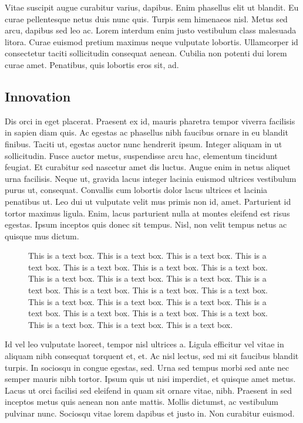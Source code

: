 \documentclass[
  11pt,
  letterpaper,
  DIV=11,
  numbers=noendperiod]{scrartcl}
\begin{document}
Vitae suscipit augue curabitur varius, dapibus. Enim phasellus elit ut
blandit. Eu curae pellentesque netus duis nunc quis. Turpis sem
himenaeos nisl. Metus sed arcu, dapibus sed leo ac. Lorem interdum enim
justo vestibulum class malesuada litora. Curae euismod pretium maximus
neque vulputate lobortis. Ullamcorper id consectetur taciti sollicitudin
consequat aenean. Cubilia non potenti dui lorem curae amet. Penatibus,
quis lobortis eros sit, ad.

\hypertarget{innovation}{%
\subsection{Innovation}\label{innovation}}

Dis orci in eget placerat. Praesent ex id, mauris pharetra tempor
viverra facilisis in sapien diam quis. Ac egestas ac phasellus nibh
faucibus ornare in eu blandit finibus. Taciti ut, egestas auctor nunc
hendrerit ipsum. Integer aliquam in ut sollicitudin. Fusce auctor metus,
suspendisse arcu hac, elementum tincidunt feugiat. Et curabitur sed
nascetur amet dis luctus. Augue enim in netus aliquet urna facilisis.
Neque ut, gravida lacus integer lacinia euismod ultrices vestibulum
purus ut, consequat. Convallis cum lobortis dolor lacus ultrices et
lacinia penatibus ut. Leo dui ut vulputate velit mus primis non id,
amet. Parturient id tortor maximus ligula. Enim, lacus parturient nulla
at montes eleifend est risus egestas. Ipsum inceptos quis donec sit
tempus. Nisl, non velit tempus netus ac quisque mus dictum.

\begin{figure}
This is a text box. This is a text box. This is a text box. This is a
text box. This is a text box. This is a text box. This is a text box.
This is a text box. This is a text box. This is a text box. This is a
text box. This is a text box. This is a text box. This is a text box.
This is a text box. This is a text box. This is a text box. This is a
text box. This is a text box. This is a text box. This is a text box.
This is a text box. This is a text box. This is a text box.

\end{figure}

Id vel leo vulputate laoreet, tempor nisl ultrices a. Ligula efficitur
vel vitae in aliquam nibh consequat torquent et, et. Ac nisl lectus, sed
mi sit faucibus blandit turpis. In sociosqu in congue egestas, sed. Urna
sed tempus morbi sed ante nec semper mauris nibh tortor. Ipsum quis ut
nisi imperdiet, et quisque amet metus. Lacus ut orci facilisi sed
eleifend in quam sit ornare vitae, nibh. Praesent in sed inceptos metus
quis aenean non ante mattis. Mollis dictumst, ac vestibulum pulvinar
nunc. Sociosqu vitae lorem dapibus et justo in. Non curabitur euismod.
\end{document}
